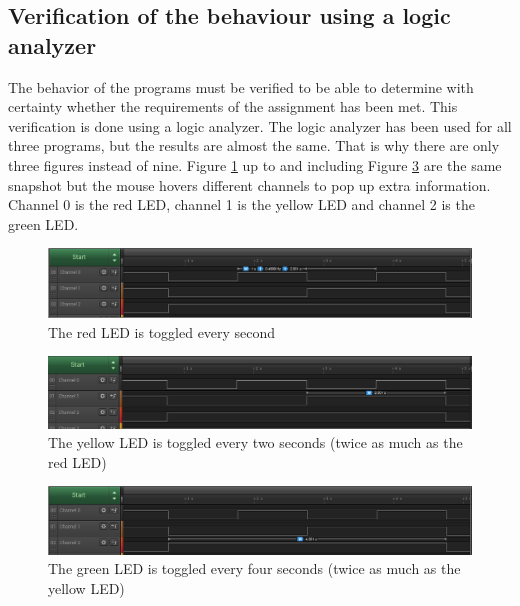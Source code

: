 \newpage
\subsection{Verification of the behaviour using a logic analyzer}

The behavior of the programs must be verified to be able to determine with certainty whether the requirements of the assignment has been met.
This verification is done using a logic analyzer.
The logic analyzer has been used for all three programs, but the results are almost the same.
That is why there are only three figures instead of nine.
Figure \ref{fig:led_togglee1} up to and including Figure \ref{fig:led_togglee3} are the same snapshot but the mouse hovers different channels to pop up extra information.
Channel 0 is the red LED, channel 1 is the yellow LED and channel 2 is the green LED.

\begin{figure}[H]
\centering
    \includegraphics[scale=0.4]{img/led_toggle1.png}
\caption{The red LED is toggled every second}
\label{fig:led_togglee1}

\end{figure}

\begin{figure}[H]
\centering
    \includegraphics[scale=0.4]{img/led_toggle2.png}
\caption{The yellow LED is toggled every two seconds (twice as much as the red LED)}
\label{fig:led_togglee2}

\end{figure}

\begin{figure}[H]
\centering
    \includegraphics[scale=0.4]{img/led_toggle3.png}
\caption{The green LED is toggled every four seconds (twice as much as the yellow LED)}
\label{fig:led_togglee3}

\end{figure}
